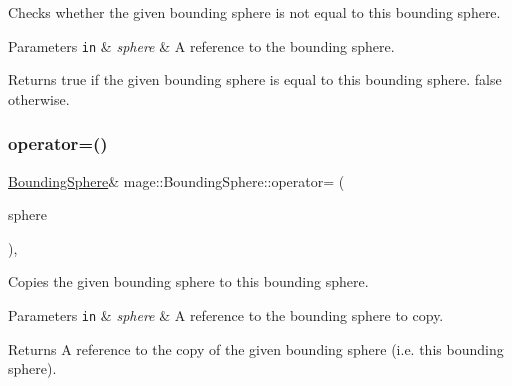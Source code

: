 Checks whether the given bounding sphere is not equal to this bounding sphere.


\begin{DoxyParams}[1]{Parameters}
\mbox{\tt in}  & {\em sphere} & A reference to the bounding sphere. \\
\hline
\end{DoxyParams}
\begin{DoxyReturn}{Returns}
{\ttfamily true} if the given bounding sphere is equal to this bounding sphere. {\ttfamily false} otherwise. 
\end{DoxyReturn}
\mbox{\label{classmage_1_1_bounding_sphere_ad8159156e4258d23afdb43e4a9104743}} 
\subsubsection{\texorpdfstring{operator=()}{operator=()}\hspace{0.1cm}{\footnotesize\ttfamily [1/2]}}
{\footnotesize\ttfamily \mbox{\hyperlink{classmage_1_1_bounding_sphere}{Bounding\+Sphere}}\& mage\+::\+Bounding\+Sphere\+::operator= (\begin{DoxyParamCaption}\item[{const \mbox{\hyperlink{classmage_1_1_bounding_sphere}{Bounding\+Sphere}} \&}]{sphere }\end{DoxyParamCaption})\hspace{0.3cm}{\ttfamily [default]}, {\ttfamily [noexcept]}}

Copies the given bounding sphere to this bounding sphere.


\begin{DoxyParams}[1]{Parameters}
\mbox{\tt in}  & {\em sphere} & A reference to the bounding sphere to copy. \\
\hline
\end{DoxyParams}
\begin{DoxyReturn}{Returns}
A reference to the copy of the given bounding sphere (i.\+e. this bounding sphere). 
\end{DoxyReturn}
\mbox{\label{classmage_1_1_bounding_sphere_a2a0e22660b37c54bb0e2e76efc198281}} 
